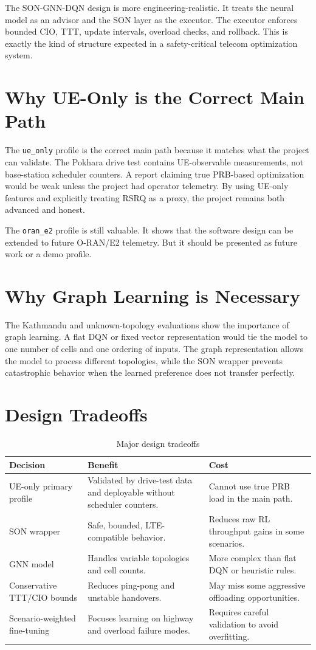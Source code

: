 \documentclass[12pt,a4paper]{report}
\newcommand{\ueonly}{\texttt{ue\_only}}
\newcommand{\orane}{\texttt{oran\_e2}}
\begin{document}
The SON-GNN-DQN design is more engineering-realistic. It treats the neural model as an advisor and the SON layer as the executor. The executor enforces bounded CIO, TTT, update intervals, overload checks, and rollback. This is exactly the kind of structure expected in a safety-critical telecom optimization system.

\section{Why UE-Only is the Correct Main Path}
The \ueonly{} profile is the correct main path because it matches what the project can validate. The Pokhara drive test contains UE-observable measurements, not base-station scheduler counters. A report claiming true PRB-based optimization would be weak unless the project had operator telemetry. By using UE-only features and explicitly treating RSRQ as a proxy, the project remains both advanced and honest.

The \orane{} profile is still valuable. It shows that the software design can be extended to future O-RAN/E2 telemetry. But it should be presented as future work or a demo profile.

\section{Why Graph Learning is Necessary}
The Kathmandu and unknown-topology evaluations show the importance of graph learning. A flat DQN or fixed vector representation would tie the model to one number of cells and one ordering of inputs. The graph representation allows the model to process different topologies, while the SON wrapper prevents catastrophic behavior when the learned preference does not transfer perfectly.

\section{Design Tradeoffs}
\begin{table}[H]
\centering
\caption{Major design tradeoffs}
\begin{tabularx}{\textwidth}{p{}Y Y}
\toprule
\textbf{Decision} & \textbf{Benefit} & \textbf{Cost}\\
\midrule
UE-only primary profile & Validated by drive-test data and deployable without scheduler counters. & Cannot use true PRB load in the main path.\\
SON wrapper & Safe, bounded, LTE-compatible behavior. & Reduces raw RL throughput gains in some scenarios.\\
GNN model & Handles variable topologies and cell counts. & More complex than flat DQN or heuristic rules.\\
Conservative TTT/CIO bounds & Reduces ping-pong and unstable handovers. & May miss some aggressive offloading opportunities.\\
Scenario-weighted fine-tuning & Focuses learning on highway and overload failure modes. & Requires careful validation to avoid overfitting.\\
\bottomrule
\end{tabularx}
\end{table}
\end{document}
